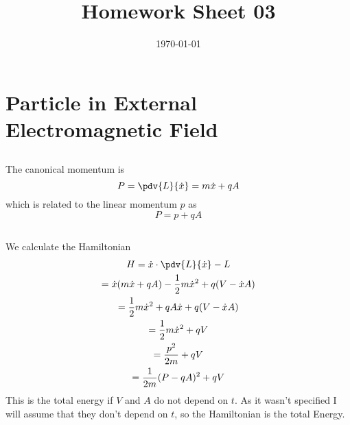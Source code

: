 \documentclass[]{scrartcl}
\title{Homework Sheet 03}
\author{}
\date{\today}
\begin{document}
\maketitle
\newpage
\tableofcontents
\newpage

\section{Particle in External Electromagnetic Field}

\subsection{}

The canonical momentum is
\begin{equation}
	P = \pdv{L}{\dot x} = m\dot x + qA
\end{equation}
which is related to the linear momentum $p$ as
\begin{equation}
	P = p + qA
\end{equation}

\subsection{}

We calculate the Hamiltonian
\begin{gather}
	H = \dot x\cdot \pdv{L}{\dot x} - L\\
	= \dot x (m\dot x + qA) - \frac{1}{2}m\dot x^2 + q(V - \dot x A)\\
	= \frac{1}{2}m\dot x^2 + qA\dot x + q(V -\dot x A)\\
	= \frac{1}{2}m\dot x^2 + qV\\
	= \frac{p^2}{2m} + qV\\
	= \frac{1}{2m}(P-qA)^2 + qV
\end{gather}
This is the total energy if $V$ and $A$ do not depend on $t$. As it wasn't specified I will assume that they don't depend on $t$, so the Hamiltonian is the total Energy.
\end{document}
